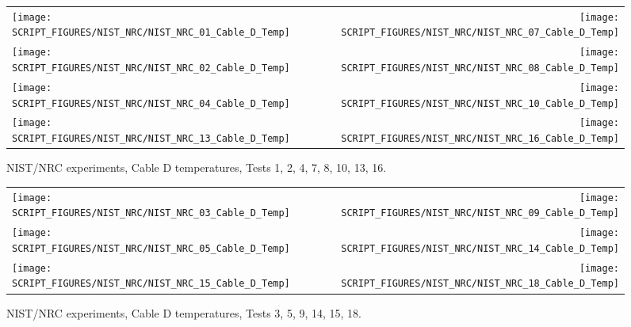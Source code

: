 \begin{figure}[p]
\begin{tabular*}{\textwidth}{l@{\extracolsep{\fill}}r}
\texttt{[image: SCRIPT\_FIGURES/NIST\_NRC/NIST\_NRC\_01\_Cable\_D\_Temp]} &
\texttt{[image: SCRIPT\_FIGURES/NIST\_NRC/NIST\_NRC\_07\_Cable\_D\_Temp]} \\
\texttt{[image: SCRIPT\_FIGURES/NIST\_NRC/NIST\_NRC\_02\_Cable\_D\_Temp]} &
\texttt{[image: SCRIPT\_FIGURES/NIST\_NRC/NIST\_NRC\_08\_Cable\_D\_Temp]} \\
\texttt{[image: SCRIPT\_FIGURES/NIST\_NRC/NIST\_NRC\_04\_Cable\_D\_Temp]} &
\texttt{[image: SCRIPT\_FIGURES/NIST\_NRC/NIST\_NRC\_10\_Cable\_D\_Temp]} \\
\texttt{[image: SCRIPT\_FIGURES/NIST\_NRC/NIST\_NRC\_13\_Cable\_D\_Temp]} &
\texttt{[image: SCRIPT\_FIGURES/NIST\_NRC/NIST\_NRC\_16\_Cable\_D\_Temp]}
\end{tabular*}
\caption[NIST/NRC experiments, Cable D temperatures, Tests 1, 2, 4, 7, 8, 10, 13, 16]{NIST/NRC experiments, Cable D temperatures, Tests 1, 2, 4, 7, 8, 10, 13, 16.}
\label{NIST_NRC_Cable_D_Closed}
\end{figure}

\begin{figure}[p]
\begin{tabular*}{\textwidth}{l@{\extracolsep{\fill}}r}
\texttt{[image: SCRIPT\_FIGURES/NIST\_NRC/NIST\_NRC\_03\_Cable\_D\_Temp]} &
\texttt{[image: SCRIPT\_FIGURES/NIST\_NRC/NIST\_NRC\_09\_Cable\_D\_Temp]} \\
\texttt{[image: SCRIPT\_FIGURES/NIST\_NRC/NIST\_NRC\_05\_Cable\_D\_Temp]} &
\texttt{[image: SCRIPT\_FIGURES/NIST\_NRC/NIST\_NRC\_14\_Cable\_D\_Temp]} \\
\texttt{[image: SCRIPT\_FIGURES/NIST\_NRC/NIST\_NRC\_15\_Cable\_D\_Temp]} &
\texttt{[image: SCRIPT\_FIGURES/NIST\_NRC/NIST\_NRC\_18\_Cable\_D\_Temp]}
\end{tabular*}
\caption[NIST/NRC experiments, Cable D temperatures, Tests 3, 5, 9, 14, 15, 18]{NIST/NRC experiments, Cable D temperatures, Tests 3, 5, 9, 14, 15, 18.}
\label{NIST_NRC_Cable_D_Open}
\end{figure}

